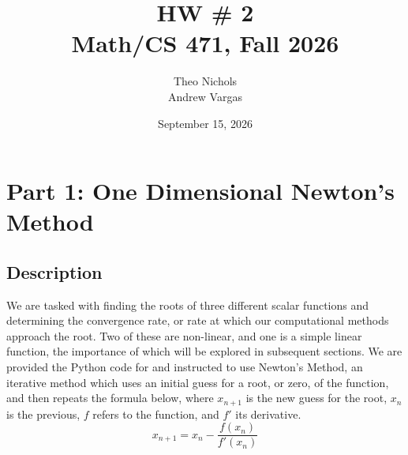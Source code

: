 \documentclass[12pt]{article}
\title{ HW \# 2\\ Math/CS 471, Fall 2026}
\author{Theo Nichols \\ Andrew Vargas}
\date{September 15, 2026}   %
\begin{document}
\maketitle
\clearpage

\section{Part 1: One Dimensional Newton's Method}

\subsection{Description}
We are tasked with finding the roots of three different scalar functions and determining the convergence rate, or rate at which our computational methods approach the root. Two of these are non-linear, and one is a simple linear function, the importance of which will be explored in subsequent sections. We are provided the Python code for and instructed to use Newton's Method, an iterative method which uses an initial guess for a root, or zero, of the function, and then repeats the formula below, where $x_{n+1}$ is the new guess for the root, $x_n$ is the previous, $f$ refers to the function, and $f'$ its derivative.
\begin{equation*}
    x_{n+1} = x_n - \frac{f(x_n)}{f'(x_n)}
\end{equation*}
\end{document}
